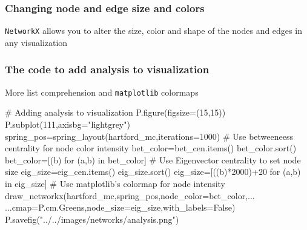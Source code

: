 \documentclass[xcolor=dvipsnames, 9pt]{beamer}
\newenvironment{code}{\begin{semiverbatim} \begin{footnotesize}}
{\end{footnotesize}\end{semiverbatim}}
\begin{document}
\begin{frame}[fragile]
    \frametitle{Changing node and edge size and colors}
    \texttt{NetworkX} allows you to alter the size, color and shape of the nodes and edges in any visualization
\end{frame}

\begin{frame}[fragile]
    \frametitle{The code to add analysis to visualization}
    \begin{block}{More list comprehension and \texttt{matplotlib} colormaps}
        \begin{code}
\alert<2>{# Adding analysis to visualization
P.figure(figsize=(15,15))
P.subplot(111,axisbg="lightgrey")
spring_pos=spring_layout(hartford_mc,iterations=1000)}
\alert<3>{# Use betweeneess centrality for node color intensity
bet_color=bet_cen.items()
bet_color.sort()
bet_color=[(b) for (a,b) in bet_color]}
\alert<4>{# Use Eigenvector centrality to set node size
eig_size=eig_cen.items()
eig_size.sort()
eig_size=[((b)*2000)+20 for (a,b) in eig_size]}
\alert<5>{# Use matplotlib's colormap for node intensity 
draw_networkx(hartford_mc,spring_pos,node_color=bet_color,...
    ...cmap=P.cm.Greens,node_size=eig_size,with_labels=False)
P.savefig("../../images/networks/analysis.png")}
        \end{code}
    \end{block}
\end{frame}
\end{document}
